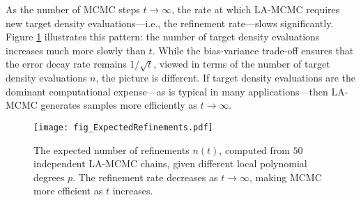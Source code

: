 As the number of MCMC steps $t \rightarrow \infty$, the rate at which LA-MCMC requires new target density evaluations---i.e., the refinement rate---slows significantly. Figure \ref{fig:1d-example-expected-refinements} illustrates this pattern: the number of target density evaluations increases much more slowly than $t$. While the bias-variance trade-off ensures that the error decay rate remains $1/\sqrt{t}$, viewed in terms of the number of target density evaluations $n$, the picture is different. If target density evaluations are the dominant computational expense---as is typical in many applications---then LA-MCMC generates samples more efficiently as $t \rightarrow \infty$.

\begin{figure}[h!]
\centering
    \texttt{[image: fig\_ExpectedRefinements.pdf]}
    \caption{The expected number of refinements $n(t)$, computed from $50$ independent LA-MCMC chains, given different local polynomial degrees $p$.
    The refinement rate decreases as $t \rightarrow \infty$, making MCMC more efficient as $t$ increases.}
    \label{fig:1d-example-expected-refinements}
\end{figure}
